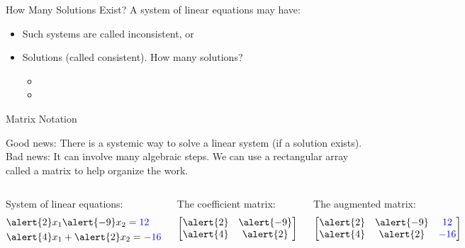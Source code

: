 \documentclass[xcolor=dvipsnames,aspectratio=169,t]{beamer}
\begin{document}
\begin{frame}{How Many Solutions Exist?}
  \pause
  A system of linear equations may have:
  \begin{itemize}
  \item {} Such systems are called \alert{inconsistent}, or
  \item Solutions (called \alert{consistent}).  How many solutions?
    \begin{itemize}
      \item {}
      \item {}
    \end{itemize}
  \end{itemize}
\end{frame}


\begin{frame}{Matrix Notation}

  \bi
  \ii Good news: There is a systemic way to solve a linear system (if a solution exists).
  \ii Bad news: It can involve many algebraic steps.
  \ii We can use a rectangular array called a \alert{matrix} to help organize the work.
  \ei

  \vspace*{2em}
  
  \begin{columns}[T]
    \column{0.33\tw}
    System of linear equations:
    \begin{align*}
      & \alert{2}x_1 \alert{-9}x_2 = \colorb{12} \\
      & \alert{4}x_1 +\alert{2}x_2= \colorb{-16}
    \end{align*} 

    \column{0.33\tw}
    The \alert{coefficient matrix}:
      \[ 
        \begin{bmatrix}
          \alert{2} & \alert{-9} \\
          \alert{4} & \alert{2} 
        \end{bmatrix}
      \]

    \column{0.33\tw}
    The \alert{augmented matrix}:
      \[ 
        \begin{bmatrix}
          \alert{2} & \alert{-9} & \colorb{12}\\
          \alert{4} & \alert{2} & \colorb{-16}
        \end{bmatrix}
      \]
  \end{columns}

\end{frame}
\end{document}
